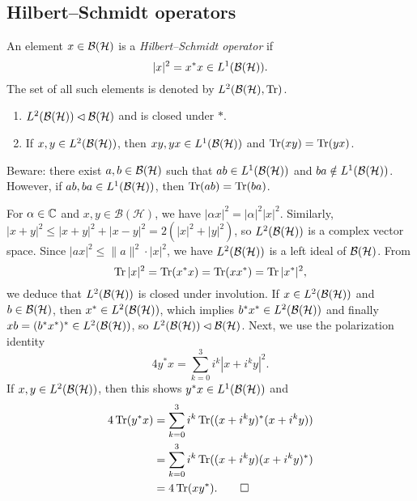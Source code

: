 \subsection{Hilbert--Schmidt operators}

\begin{definition}
  An element $x \in \bh$ is a \emph{Hilbert--Schmidt operator} 
  if $$|x|^2 = x^* x \in L^1 (\bh).$$
  The set of all such elements is denoted by $L^2 (\bh, \trace)$. 
\end{definition}

\begin{proposition}
  \begin{enumerate}
    \item $L^2 (\bh) \lhd \bh$ and is closed under $*$.
    \item If $x, y \in L^2 (\bh)$, then $xy, yx \in L^1 (\bh)$ and $\trace(xy) = \trace (yx)$.
  \end{enumerate}
\end{proposition}

\begin{remark}
  Beware: there exist $a, b \in \bh$ such that $ab \in L^1 (\bh)$
  and $ba \notin L^1 (\bh)$. However, if $ab, ba \in L^1 (\bh)$,
  then $\trace (ab) = \trace (ba)$.
\end{remark}

\begin{myproof}
  For $\alpha \in \C$ and $x, y \in \mathcal{B}(\mathcal{H})$, we have $|\alpha x|^2 = |\alpha|^2 |x|^2$.
  Similarly, $|x + y|^2 \leq |x + y|^2 + |x - y|^2 = 2 (|x|^2 + |y|^2)$, so $L^2 (\bh)$ is a complex vector space.
  Since $|ax|^2 \leq \| a\|^2 \cdot |x|^2$, we have $L^2 (\bh)$ is a left ideal of $\bh$.
  From 
  $$\trace |x|^2 = \trace (x^* x) = \trace (x x^*) = \trace |x^* |^2,$$
  we deduce that $L^2 (\bh)$ is closed under involution.
  If $x \in L^2 (\bh)$ and $b \in \bh$,
  then $x^* \in L^2 (\bh)$, which implies $b^* x^* \in L^2 (\bh)$ and finally $xb = (b^* x^*)^* \in L^2 (\bh)$,
  so $L^2 (\bh) \lhd \bh$.
  Next, we use the polarization identity 
  $$4 y^* x = \sum_{k = 0} ^3 i^k |x + i^k y|^2.$$
  If $x, y \in L^2 (\bh)$, then this shows $y^* x \in L^1 (\bh)$
  and 
  \begin{align*}
    4 \trace (y^* x) &= \sum_{k = 0} ^3 i^k \trace ((x + i^k y)^*(x + i^k y))\\
    &= \sum_{k = 0} ^3 i^k \trace ((x + i^k y)(x + i^k y)^*)\\
    &= 4 \trace (x y^*). \qedhere
  \end{align*}
\end{myproof}


